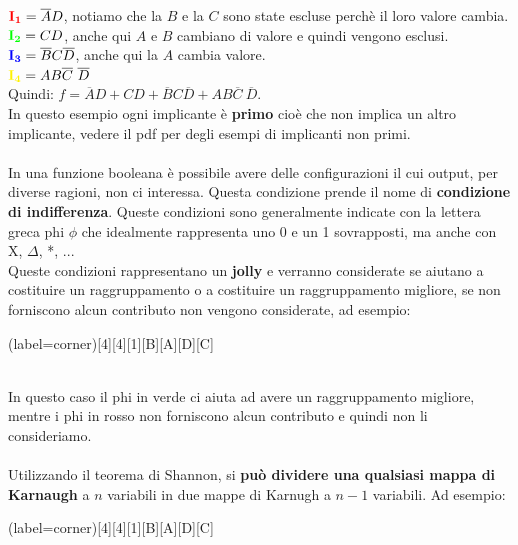\documentclass[12pt]{report}
\begin{document}
				$\mathbf{\color{red}I_1} = \overline{A}D$, notiamo che la $B$ e la $C$ sono state escluse perchè il loro valore cambia. \\
				$\mathbf{\color{green}I_2} = CD$, anche qui $A$ e $B$ cambiano di valore e quindi vengono esclusi. \\
				$\mathbf{\color{blue}I_3} = \overline{B}C\overline{D}$, anche qui la $A$ cambia valore. \\
				$\mathbf{\color{yellow}I_4} = AB\overline{C}\ \overline{D}$ \\
				Quindi: $f = \overline{A}D + CD + \overline{B}C\overline{D} + AB\overline{C}\ \overline{D}$.  \\
				In questo esempio ogni implicante è \textbf{primo} cioè che non implica un altro implicante, vedere il pdf per degli esempi di implicanti non primi. \\ \\
				In una funzione booleana è possibile avere delle configurazioni il cui output, per diverse ragioni, non ci interessa. Questa condizione prende il nome di \textbf{condizione di indifferenza}. Queste condizioni sono generalmente indicate con la lettera greca phi $\phi$ che idealmente rappresenta uno 0 e un 1 sovrapposti, ma anche con X, $\Delta$, *, ... \\
				Queste condizioni rappresentano un \textbf{jolly} e verranno considerate se aiutano a costituire un raggruppamento o a costituire un raggruppamento migliore, se non forniscono alcun contributo non vengono considerate, ad esempio:
				\begin{karnaugh-map}(label=corner)[4][4][1][B][A][D][C]
				\end{karnaugh-map} \\
				In questo caso il phi in verde ci aiuta ad avere un raggruppamento migliore, mentre i phi in rosso non forniscono alcun contributo e quindi non li consideriamo.
				\\ \\
				Utilizzando il teorema di Shannon, si \textbf{può dividere una qualsiasi mappa di Karnaugh} a $n$ variabili in due mappe di Karnugh a $n - 1$ variabili. Ad esempio: \\
				\begin{karnaugh-map}(label=corner)[4][4][1][B][A][D][C]
				\end{karnaugh-map} \\
\end{document}
